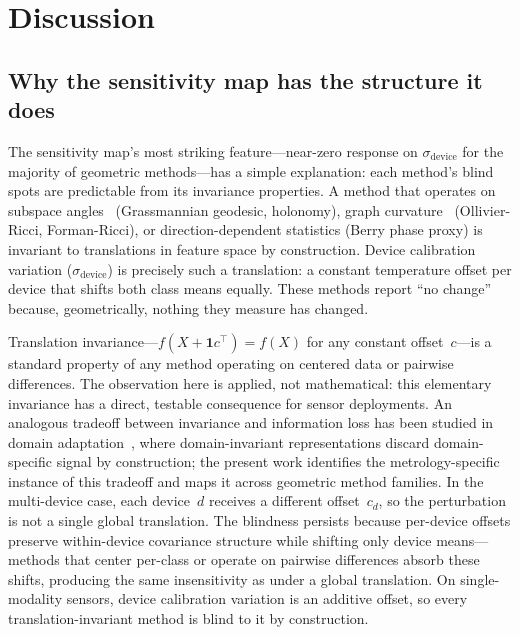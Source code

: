 \documentclass[11pt]{article}
\begin{document}
\section{Discussion}
\label{sec:discussion}

\subsection{Why the sensitivity map has the structure it does}

The sensitivity map's most striking feature---near-zero response on
$\sigma_\text{device}$ for the majority of geometric methods---has a
simple explanation: each method's blind spots are predictable from its
invariance properties.  A method that operates on subspace
angles~\citep{absil2008optimization,chikuse2003statistics} (Grassmannian geodesic, holonomy),
graph curvature~\citep{samal2018comparative} (Ollivier-Ricci,
Forman-Ricci), or direction-dependent statistics (Berry phase proxy) is
invariant to translations in feature space by construction.  Device calibration variation ($\sigma_\text{device}$)
is precisely such a translation: a constant temperature offset per
device that shifts both class means equally.  These methods report
``no change'' because, geometrically, nothing they measure has changed.

Translation invariance---$f(X + \mathbf{1}c^\top) = f(X)$ for any
constant offset~$c$---is a standard property of any method operating on
centered data or pairwise differences.  The observation here is applied, not mathematical: this elementary
invariance has a direct, testable consequence for sensor deployments.
An analogous tradeoff between invariance and information loss has been
studied in domain adaptation~\citep{bendavid2010theory}, where
domain-invariant representations discard domain-specific signal by
construction; the present work identifies the metrology-specific
instance of this tradeoff and maps it across geometric method families.  In the multi-device case, each
device~$d$ receives a different offset~$c_d$, so the perturbation is
not a single global translation.  The blindness persists because per-device
offsets preserve within-device covariance structure while shifting only
device means---methods that center per-class or operate on pairwise
differences absorb these shifts, producing the same insensitivity as
under a global translation.  On single-modality sensors, device
calibration variation is an additive offset, so every
translation-invariant method is blind to it by construction.
\end{document}
